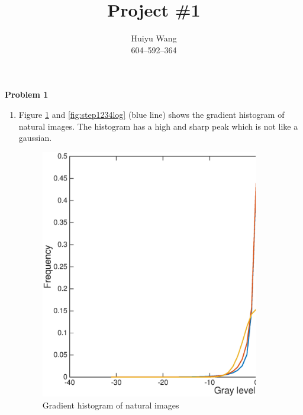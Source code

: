 \documentclass[11pt, oneside]{article}   	%
\title{Project \#1}
\author{Huiyu Wang\\604--592--364}
\date{}							%
\begin{document}
\maketitle

{\bf Problem 1}

\begin{enumerate}
	\item Figure \ref{fig:step1234} and \ref{fig:step1234log} (blue line) shows the gradient histogram of natural images. The histogram has a high and sharp peak which is not like a gaussian.
\begin{figure}[H]
	\centering
	\includegraphics[width=0.9\textwidth]{step1234}
	\caption{Gradient histogram of natural images}
	\label {fig:step1234}
\end{figure}
\begin{figure}[H]
	\centering

\end{figure}
\end{enumerate}
\end{document}
